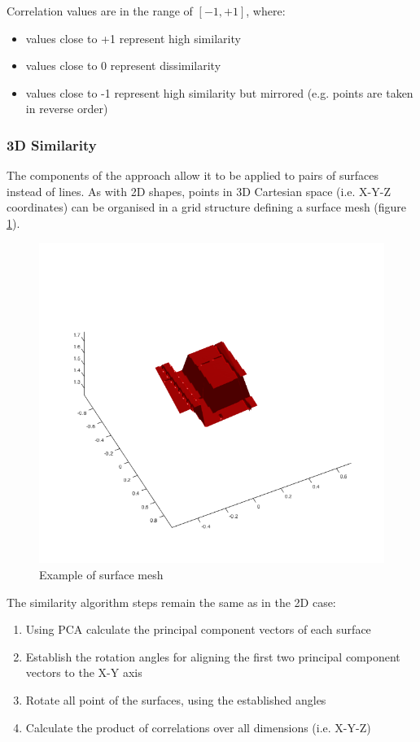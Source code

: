 \documentclass[11]{article}
\begin{document}
Correlation values are in the range of $[-1,+1]$, where:
\begin{itemize}
    \item values close to +1 represent high similarity
    \item values close to 0 represent dissimilarity 
    \item values close to -1 represent high similarity but mirrored (e.g. points are taken in reverse order) 
\end{itemize}

\pagebreak[2]
\subsubsection{3D Similarity}

The components of the approach allow it to be applied to pairs of surfaces instead of lines. 
As with 2D shapes, points in 3D Cartesian space (i.e. X-Y-Z coordinates) can be organised in a grid structure defining a surface mesh (figure \ref{fig:mesh_example}).

\begin{figure}[h]
  \centering
  \includegraphics[width=.5\textwidth]{figures/mesh_example.png}
  \caption{Example of surface mesh}
  \label{fig:mesh_example}
\end{figure}  

The similarity algorithm steps remain the same as in the 2D case: 
\begin{enumerate}
    \item Using PCA calculate the principal component vectors of each surface 
    \item Establish the rotation angles for aligning the first two principal component vectors to the X-Y axis 
    \item Rotate all point of the surfaces, using the established angles
    \item Calculate the product of correlations over all dimensions (i.e. X-Y-Z) 
\end{enumerate}
\end{document}
